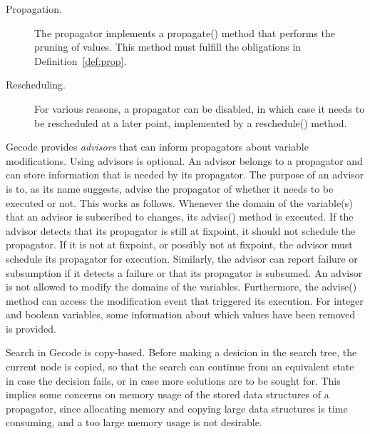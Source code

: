\documentclass[a4paper,11pt]{article}
\numberwithin{equation}{section}
\begin{document}
\begin{description}
  \item[Propagation.] The propagator implements a propagate() method
    that performs the pruning of values. This method must fulfill
    the obligations in Definition~\ref{def:prop}.

  \item[Rescheduling.] For various reasons, a propagator can be disabled,
    in which case it needs to be rescheduled at a later point, implemented
    by a reschedule() method.

\end{description}


Gecode provides \emph{advisors} that can inform propagators about variable
modifications.
Using advisors is optional.
An advisor belongs to a propagator and can store information that is needed by
its propagator. The purpose of an advisor is to, as its name suggests, advise
the propagator of whether it needs to be executed or not. This works as follows.
Whenever the domain
of the variable(s) that an advisor is subscribed to changes, its advise()
method is executed. If the advisor detects that its propagator is still
at fixpoint, it should not schedule the propagator. If it is not at fixpoint,
or possibly not at fixpoint, the advisor must schedule its propagator for
execution. Similarly, the advisor can report failure or subsumption
if it detects a failure or that its propagator is subsumed. An advisor
is not allowed to modify the domains of the variables. 
Furthermore, the advise() method can access
the modification event that triggered its execution. 
For integer and boolean variables, some information about which values
have been removed is provided.

Search in Gecode is copy-based. Before making a desicion in the search tree, the
current node is copied, so that the search can continue from an equivalent 
state in case the decision fails, or in case more solutions are to be sought for.
This implies some concerns on memory usage of the stored data structures
of a propagator, since allocating memory and copying large data structures
is time consuming, and a too large memory usage is not desirable.



\end{document}
